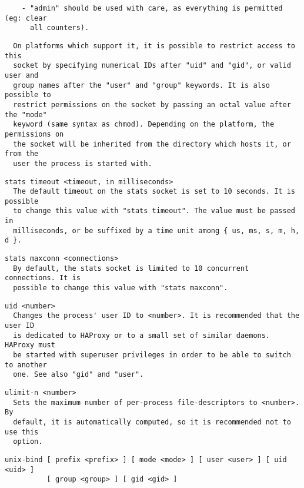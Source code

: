\begin{verbatim}
    - "admin" should be used with care, as everything is permitted (eg: clear
      all counters).
\end{verbatim}

\begin{verbatim}
  On platforms which support it, it is possible to restrict access to this
  socket by specifying numerical IDs after "uid" and "gid", or valid user and
  group names after the "user" and "group" keywords. It is also possible to
  restrict permissions on the socket by passing an octal value after the "mode"
  keyword (same syntax as chmod). Depending on the platform, the permissions on
  the socket will be inherited from the directory which hosts it, or from the
  user the process is started with.
\end{verbatim}

\begin{verbatim}
stats timeout <timeout, in milliseconds>
  The default timeout on the stats socket is set to 10 seconds. It is possible
  to change this value with "stats timeout". The value must be passed in
  milliseconds, or be suffixed by a time unit among { us, ms, s, m, h, d }.
\end{verbatim}

\begin{verbatim}
stats maxconn <connections>
  By default, the stats socket is limited to 10 concurrent connections. It is
  possible to change this value with "stats maxconn".
\end{verbatim}

\begin{verbatim}
uid <number>
  Changes the process' user ID to <number>. It is recommended that the user ID
  is dedicated to HAProxy or to a small set of similar daemons. HAProxy must
  be started with superuser privileges in order to be able to switch to another
  one. See also "gid" and "user".
\end{verbatim}

\begin{verbatim}
ulimit-n <number>
  Sets the maximum number of per-process file-descriptors to <number>. By
  default, it is automatically computed, so it is recommended not to use this
  option.
\end{verbatim}

\begin{verbatim}
unix-bind [ prefix <prefix> ] [ mode <mode> ] [ user <user> ] [ uid <uid> ]
          [ group <group> ] [ gid <gid> ]
\end{verbatim}

